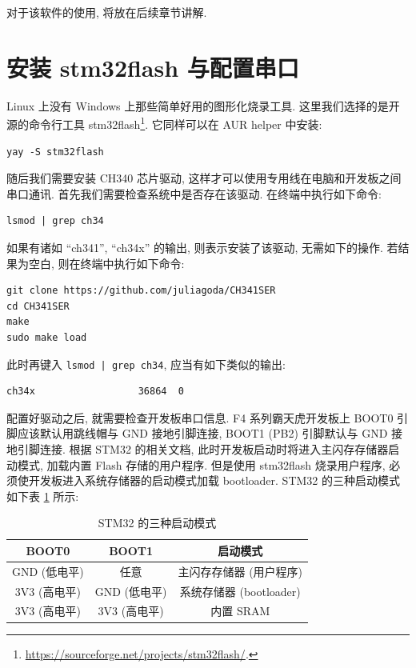 对于该软件的使用, 将放在后续章节讲解.

\section{安装 stm32flash 与配置串口}
Linux 上没有 Windows 上那些简单好用的图形化烧录工具. 这里我们选择的是开源的命令行工具 stm32flash\footnote{\url{https://sourceforge.net/projects/stm32flash/}.}. 它同样可以在 AUR helper 中安装:

\begin{verbatim}
yay -S stm32flash
\end{verbatim}

随后我们需要安装 CH340 芯片驱动, 这样才可以使用专用线在电脑和开发板之间串口通讯. 首先我们需要检查系统中是否存在该驱动. 在终端中执行如下命令:

\begin{verbatim}
lsmod | grep ch34
\end{verbatim}

如果有诸如 ``ch341'', ``ch34x'' 的输出, 则表示安装了该驱动, 无需如下的操作. 若结果为空白, 则在终端中执行如下命令:

\begin{verbatim}
git clone https://github.com/juliagoda/CH341SER
cd CH341SER
make
sudo make load
\end{verbatim}

此时再键入 \texttt{lsmod | grep ch34}, 应当有如下类似的输出:

\begin{verbatim}
ch34x                  36864  0
\end{verbatim}

配置好驱动之后, 就需要检查开发板串口信息. F4 系列霸天虎开发板上 BOOT0 引脚应该默认用跳线帽与 GND 接地引脚连接, BOOT1 (PB2) 引脚默认与 GND 接地引脚连接. 根据 STM32 的相关文档, 此时开发板启动时将进入主闪存存储器启动模式, 加载内置 Flash 存储的用户程序. 但是使用 stm32flash 烧录用户程序, 必须使开发板进入系统存储器的启动模式加载 bootloader. STM32 的三种启动模式如下表 \ref{tab:1-env boot} 所示:

\begin{table}[H]
    \centering
    \caption{STM32 的三种启动模式} \label{tab:1-env boot}
    \begin{tabular}{ccc} \toprule
        \textbf{BOOT0} & \textbf{BOOT1} & \textbf{启动模式}      \\\midrule
        GND (低电平)      & 任意             & 主闪存存储器 (用户程序)      \\
        3V3 (高电平)      & GND (低电平)      & 系统存储器 (bootloader) \\
        3V3 (高电平)      & 3V3 (高电平)      & 内置 SRAM            \\
        \bottomrule
    \end{tabular}
\end{table}

